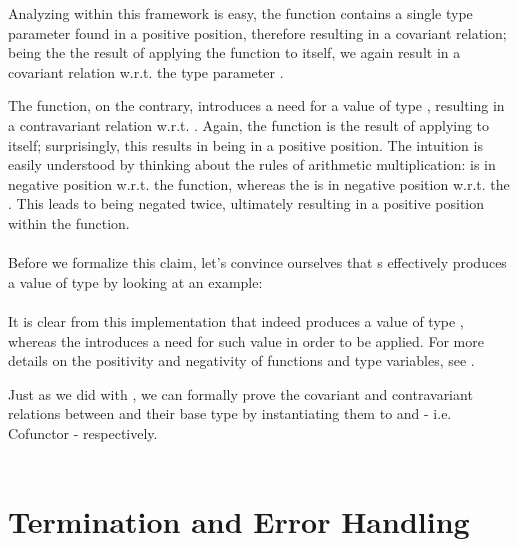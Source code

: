 Analyzing  within this framework is easy, the  function contains a single type parameter found in a positive position, therefore resulting in a covariant relation; being the  the result of applying the  function to itself, we again result in a covariant relation w.r.t. the type parameter .

The  function, on the contrary, introduces a need for a value of type , resulting in a contravariant relation w.r.t. . Again, the  function is the result of applying  to itself; surprisingly, this results in  being in a positive position. The intuition is easily understood by thinking about the rules of arithmetic multiplication:  is in negative position w.r.t. the  function, whereas the  is in negative position w.r.t. the . This leads to  being negated twice, ultimately resulting in a positive position within the  function.\\ 

\\

Before we formalize this claim, let's convince ourselves that s effectively produces a value of type  by looking at an example:\\

\\

It is clear from this implementation that  indeed produces a value of type , whereas the  introduces a need for such value in order to be applied. For more details on the positivity and negativity of functions and type variables, see \cite{pos-neg}\cite{pos-neg2}.

Just as we did with , we can formally prove the covariant and contravariant relations between  and their base type  by instantiating them to  and  - i.e. Cofunctor - respectively.\\

\\

\section{Termination and Error Handling}
\label{termerr}

